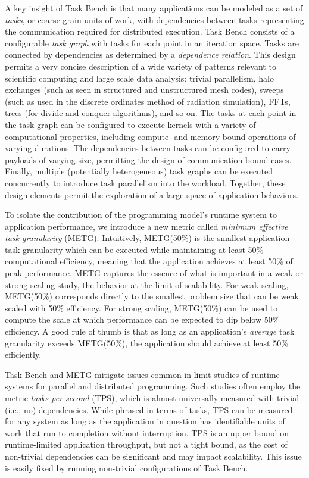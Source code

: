 A key insight of Task Bench is that many applications can be modeled
as a set of \emph{tasks}, or coarse-grain units of work, with
dependencies between tasks representing the communication required for
distributed execution. Task Bench consists of a configurable \emph{task graph} with tasks for
each point in an iteration space. Tasks are connected by dependencies
as determined by a \emph{dependence relation}. This design permits a
very concise description of a wide variety of patterns relevant to
scientific computing and large scale data analysis: trivial parallelism, halo exchanges (such as
seen in structured and unstructured mesh codes), sweeps (such as used
in the discrete ordinates method of radiation simulation), FFTs, trees
(for divide and conquer algorithms), and so on. The tasks at each
point in the task graph can be configured to execute kernels with a
variety of computational properties, including compute- and
memory-bound operations of varying durations. The dependencies between
tasks can be configured to carry payloads of varying size, permitting
the design of communication-bound cases. Finally, multiple
(potentially heterogeneous) task graphs can be executed concurrently
to introduce task parallelism into the workload. Together, these
design elements permit the exploration of a large space of application
behaviors.

To isolate the contribution of the programming model's runtime system
to application performance, we introduce a new metric called
\emph{minimum effective task granularity} (METG). Intuitively,
METG(50\%) is the smallest application task granularity which can be
executed while maintaining at least 50\% computational efficiency,
meaning that the application achieves at least 50\% of peak
performance. METG captures the essence of what is important in a weak
or strong scaling study, the behavior at the limit of scalability. For
weak scaling, METG(50\%) corresponds directly to the smallest problem
size that can be weak scaled with 50\% efficiency. For strong scaling,
METG(50\%) can be used to compute the scale at which performance can
be expected to dip below 50\% efficiency. A good rule of thumb is that
as long as an application's \emph{average} task granularity exceeds
METG(50\%), the application should achieve at least 50\% efficiently.

Task Bench and METG mitigate issues common in limit studies of runtime
systems for parallel and distributed programming. Such studies often
employ the metric \emph{tasks per second} (TPS), which is almost
universally measured with trivial (i.e., no) dependencies. While
phrased in terms of tasks, TPS can be measured for any system as long
as the application in question has identifiable units of work that run
to completion without interruption. TPS is an upper bound on
runtime-limited application throughput, but not a tight bound, as the
cost of non-trivial dependencies can be significant and may impact
scalability. This issue is easily fixed by running non-trivial
configurations of Task Bench.

